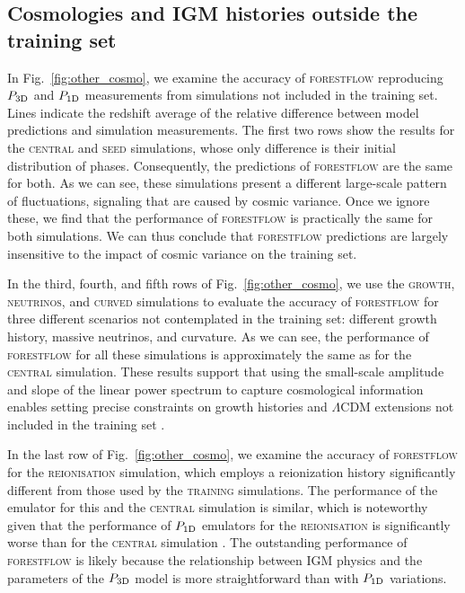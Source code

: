 \documentclass[longauth]{aa}
\newcommand{\poned}{\ensuremath{P_{\rm 1D}}\xspace}
\newcommand{\pthreed}{\ensuremath{P_{\rm 3D}}\xspace}
\newcommand{\forestflow}{\textsc{forestflow}\xspace}
\newcommand{\lacehc}{\textsc{training}\xspace}
\newcommand{\simseed}{\textsc{seed}\xspace}
\newcommand{\simigm}{\textsc{reionisation}\xspace}
\newcommand{\simcurved}{\textsc{curved}\xspace}
\newcommand{\simh}{\textsc{growth}\xspace}
\newcommand{\simnu}{\textsc{neutrinos}\xspace}
\newcommand{\simcentral}{\textsc{central}\xspace}
\begin{document}
\subsection{Cosmologies and IGM histories outside the training set}
\label{sec:results_other}

In Fig.~\ref{fig:other_cosmo}, we examine the accuracy of \forestflow reproducing \pthreed and \poned measurements from simulations not included in the training set. Lines indicate the redshift average of the relative difference between model predictions and simulation measurements. The first two rows show the results for the \simcentral and \simseed simulations, whose only difference is their initial distribution of phases. Consequently, the predictions of \forestflow are the same for both. As we can see, these simulations present a different large-scale pattern of fluctuations, signaling that are caused by cosmic variance. Once we ignore these, we find that the performance of \forestflow is practically the same for both simulations. We can thus conclude that \forestflow predictions are largely insensitive to the impact of cosmic variance on the training set.

In the third, fourth, and fifth rows of Fig.~\ref{fig:other_cosmo}, we use the \simh, \simnu, and \simcurved simulations to evaluate the accuracy of \forestflow for three different scenarios not contemplated in the training set: different growth history, massive neutrinos, and curvature. As we can see, the performance of \forestflow for all these simulations is approximately the same as for the \simcentral simulation. These results support that using the small-scale amplitude and slope of the linear power spectrum to capture cosmological information enables setting precise constraints on growth histories and $\Lambda$CDM extensions not included in the training set \citep[see also][]{Pedersen2021, pedersen2023CompressingCosmologicalInformation, cabayol-garcia2023NeuralNetworkEmulator}.

In the last row of Fig.~\ref{fig:other_cosmo}, we examine the accuracy of \forestflow for the \simigm simulation, which employs a  reionization history significantly different from those used by the \lacehc simulations. The performance of the emulator for this and the \simcentral simulation is similar, which is noteworthy given that the performance of \poned emulators for the \simigm is significantly worse than for the \simcentral simulation \citep{cabayol-garcia2023NeuralNetworkEmulator}. The outstanding performance of \forestflow is likely because the relationship between IGM physics and the parameters of the \pthreed model is more straightforward than with \poned variations.
\end{document}
